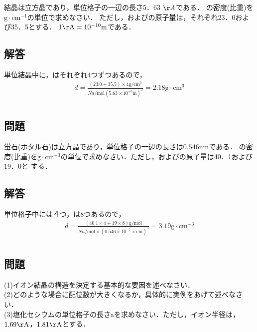 \documentclass[dvipdfmx]{article}
\begin{document}
\section{}
\begin{tcolorbox}[title=問題 1]
    結晶は立方晶であり，単位格子の一辺の長さ5．63 $\AA$である．
    の密度(比重)を$\mathrm{g \cdot cm^{-1}}$の単位で求めなさい．
    ただし，およびの原子量は，それぞれ23．0および35．5とする． 
    $1 \mathrm{\AA}=10^{-10}\mathrm{m}$である．
\end{tcolorbox}
  \subsection*{解答}
    単位結晶中に，はそれぞれ4つずつあるので，
    \begin{align*}
       d = \frac{(23.0 + 35.5) \times 4 \mathrm{g/cm^3}}{Na \mathrm{/mol} (5.63 \times 10^{-8} \mathrm{m})^3} = 2.18 \mathrm {g \cdot cm^{3}}
    \end{align*}
\section{}
  \subsection*{問題} %
    蛍石(ホタル石)は立方晶であり，単位格子の一辺の長さは$0.546 \mathrm{nm}$である．
    の密度(比重)を$\mathrm{g \cdot cm^{-3}}$の単位で求めなさい．ただし，およびの原子量は40．1および19．0と
    する．
  \subsection*{解答}
    単位格子中には４つ，は8つあるので，
    \begin{align*}
      d = \frac{(40.1 \times 4 + 19 \times 8) \mathrm{g/mol}}{Na \mathrm{/mol} \times (0.546 \times 10^{-7} \times \mathrm{cm})^3} = 3.19 \mathrm{g \cdot cm^{-3}}
    \end{align*}
\section{} 
  \subsection*{問題} %
     (1)イオン結晶の構造を決定する基本的な要因を述べなさい．\\
     (2)どのような場合に配位数が大きくなるか，具体的に実例をあげて述べなさい．\\
     (3)塩化セシウムの単位格子の長さaを求めなさい．ただし，イオン半径は，$1.69 \mathrm{\AA}$，$1.81 \mathrm{\AA}$とする．
\end{document}
